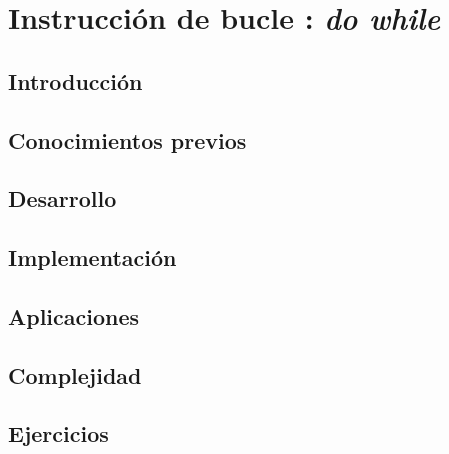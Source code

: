 \chapter{Instrucción de bucle : \emph{do while} }
\section{Introducción}

\section{Conocimientos previos}

\section{Desarrollo}

\section{Implementación}

\section{Aplicaciones}

\section{Complejidad}

\section{Ejercicios}

